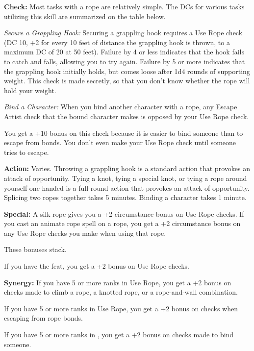 \textbf{Check:} Most tasks with a rope are relatively simple. The DCs for various tasks utilizing this skill are summarized on the table below.


\textit{Secure a Grappling Hook:} Securing a grappling hook requires a Use Rope check (DC 10, +2 for every 10 feet of distance the grappling hook is thrown, to a maximum DC of 20 at 50 feet). Failure by 4 or less indicates that the hook fails to catch and falls, allowing you to try again. Failure by 5 or more indicates that the grappling hook initially holds, but comes loose after 1d4 rounds of supporting weight. This check is made secretly, so that you don't know whether the rope will hold your weight.

\textit{Bind a Character:} When you bind another character with a rope, any Escape Artist check that the bound character makes is opposed by your Use Rope check.

You get a +10 bonus on this check because it is easier to bind someone than to escape from bonds. You don't even make your Use Rope check until someone tries to escape.

\textbf{Action:} Varies. Throwing a grappling hook is a standard action that provokes an attack of opportunity. Tying a knot, tying a special knot, or tying a rope around yourself one-handed is a full-round action that provokes an attack of opportunity. Splicing two ropes together takes 5 minutes. Binding a character takes 1 minute.

\textbf{Special:} A silk rope gives you a +2 circumstance bonus on Use Rope checks. If you cast an animate rope spell on a rope, you get a +2 circumstance bonus on any Use Rope checks you make when using that rope.

These bonuses stack.

If you have the  feat, you get a +2 bonus on Use Rope checks.

\textbf{Synergy:} If you have 5 or more ranks in Use Rope, you get a +2 bonus on  checks made to climb a rope, a knotted rope, or a rope-and-wall combination.

If you have 5 or more ranks in Use Rope, you get a +2 bonus on  checks when escaping from rope bonds.

If you have 5 or more ranks in , you get a +2 bonus on checks made to bind someone.
